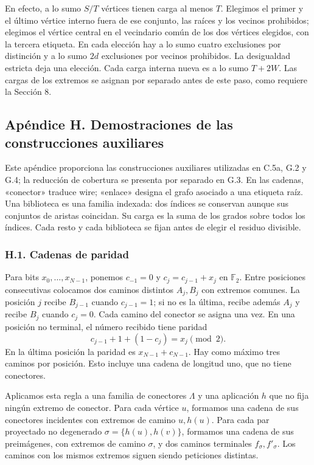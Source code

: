 \documentclass[spanish,11pt,a4paper]{article}
\begin{document}
En efecto, a lo sumo \(S/T\) vértices tienen carga al menos \(T\). Elegimos el primer y el último vértice interno fuera de ese conjunto, las raíces y los vecinos prohibidos; elegimos el vértice central en el vecindario común de los dos vértices elegidos, con la tercera etiqueta. En cada elección hay a lo sumo cuatro exclusiones por distinción y a lo sumo \(2d\) exclusiones por vecinos prohibidos. La desigualdad estricta deja una elección. Cada carga interna nueva es a lo sumo \(T+2W\). Las cargas de los extremos se asignan por separado antes de este paso, como requiere la Sección 8.

\clearpage

\subsection{Apéndice H. Demostraciones de las construcciones auxiliares}\label{apuxe9ndice-h.-demostraciones-de-las-construcciones-auxiliares}

Este apéndice proporciona las construcciones auxiliares utilizadas en C.5a, G.2 y G.4; la reducción de cobertura se presenta por separado en G.3. En las cadenas, «conector» traduce wire; «enlace» designa el grafo asociado a una etiqueta raíz. Una biblioteca es una familia indexada: dos índices se conservan aunque sus conjuntos de aristas coincidan. Su carga es la suma de los grados sobre todos los índices. Cada resto y cada biblioteca se fijan antes de elegir el residuo divisible.

\subsubsection{H.1. Cadenas de paridad}\label{h.1.-cadenas-de-paridad}

Para bits \(x_0,\ldots,x_{N-1}\), ponemos \(c_{-1}=0\) y \(c_j=c_{j-1}+x_j\) en \(\mathbb F_2\). Entre posiciones consecutivas colocamos dos caminos distintos \(A_j,B_j\) con extremos comunes. La posición \(j\) recibe \(B_{j-1}\) cuando \(c_{j-1}=1\); si no es la última, recibe además \(A_j\) y recibe \(B_j\) cuando \(c_j=0\). Cada camino del conector se asigna una vez. En una posición no terminal, el número recibido tiene paridad \[c_{j-1}+1+(1-c_j)=x_j\pmod2.\] En la última posición la paridad es \(x_{N-1}+c_{N-1}\). Hay como máximo tres caminos por posición. Esto incluye una cadena de longitud uno, que no tiene conectores.

Aplicamos esta regla a una familia de conectores \(\Lambda\) y una aplicación \(h\) que no fija ningún extremo de conector. Para cada vértice \(u\), formamos una cadena de sus conectores incidentes con extremos de camino \(u,h(u)\). Para cada par proyectado no degenerado \(\sigma=\{h(u),h(v)\}\), formamos una cadena de sus preimágenes, con extremos de camino \(\sigma\), y dos caminos terminales \(f_\sigma,f'_\sigma\). Los caminos con los mismos extremos siguen siendo peticiones distintas.
\end{document}
